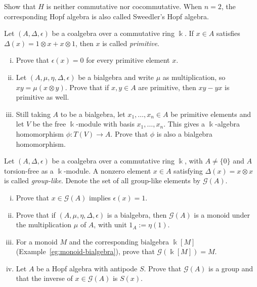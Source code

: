 	Show that $H$ is neither commutative nor cocommutative. When $n=2$, the
	corresponding Hopf algebra is also called Sweedler's Hopf algebra.

	\item Let $(A,\Delta,\epsilon)$ be a coalgebra over a commutative ring
	$\Bbbk$. If $x\in A$ satisfies $\Delta(x)=1\otimes x+x\otimes1$, then
	$x$ is called \emph{primitive}.
	\begin{enumerate}[(i)]
		\item Prove that $\epsilon(x)=0$ for every primitive element $x$.
		\item Let $(A,\mu,\eta,\Delta,\epsilon)$ be a bialgebra and write $\mu$
		as multiplication, so $xy=\mu(x\otimes y)$. Prove that if $x,y\in A$
		are primitive, then $xy-yx$ is primitive as well.
		\item Still taking $A$ to be a bialgebra, let
		$x_1,\ldots,x_n\in A$ be primitive elements and let $V$ be the free
		$\Bbbk$-module with basis $x_1,\ldots,x_n$. This gives a
		$\Bbbk$-algebra homomorphism $\phi:T(V)\to A$. Prove that $\phi$ is
		also a bialgebra homomorphism.
	\end{enumerate}

	\item Let $(A,\Delta,\epsilon)$ be a coalgebra over a commutative ring
	$\Bbbk$, with $A\neq\{0\}$ and $A$ torsion-free as a $\Bbbk$-module. A
	nonzero element $x\in A$ satisfying $\Delta(x)=x\otimes x$ is called
	\emph{group-like}. Denote the set of all group-like elements by
	$\mathcal{G}(A)$.
	\begin{enumerate}[(i)]
		\item Prove that $x\in\mathcal{G}(A)$ implies $\epsilon(x)=1$.
		\item Prove that if $(A,\mu,\eta,\Delta,\epsilon)$ is a bialgebra, then
		$\mathcal{G}(A)$ is a monoid under the multiplication $\mu$ of $A$,
		with unit $1_A:=\eta(1)$.
		\item For a monoid $M$ and the corresponding bialgebra $\Bbbk[M]$
		(Example~\ref{eg:monoid-bialgebra}), prove that
		$\mathcal{G}(\Bbbk[M])=M$.
		\item Let $A$ be a Hopf algebra with antipode $S$. Prove that
		$\mathcal{G}(A)$ is a group and that the inverse of
		$x\in\mathcal{G}(A)$ is $S(x)$.
	\end{enumerate}


